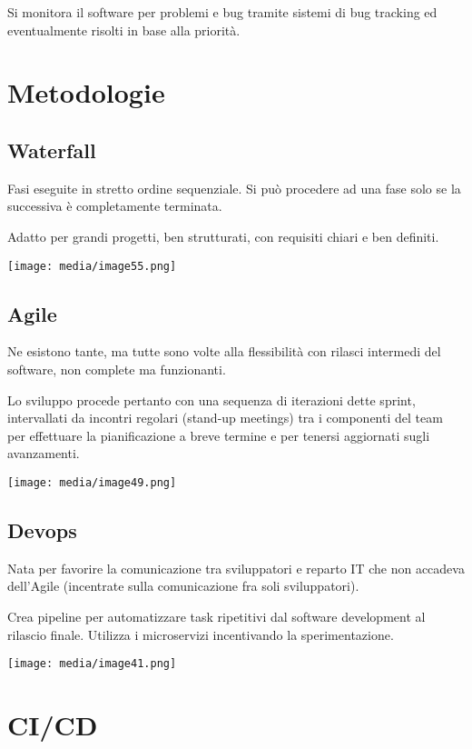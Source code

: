 Si monitora il software per problemi e bug tramite sistemi di bug
tracking ed eventualmente risolti in base alla priorità.

\section{Metodologie}\label{metodologie}

\subsection{Waterfall}\label{waterfall}

Fasi eseguite in stretto ordine sequenziale. Si può procedere ad una
fase solo se la successiva è completamente terminata.

Adatto per grandi progetti, ben strutturati, con requisiti chiari e ben
definiti.

\texttt{[image: media/image55.png]}

\subsection{Agile}\label{agile}

Ne esistono tante, ma tutte sono volte alla flessibilità con rilasci
intermedi del software, non complete ma funzionanti.

Lo sviluppo procede pertanto con una sequenza di iterazioni dette
sprint, intervallati da incontri regolari (stand-up meetings) tra i
componenti del team per effettuare la pianificazione a breve termine e
per tenersi aggiornati sugli avanzamenti.

\texttt{[image: media/image49.png]}

\subsection{Devops}\label{devops}

Nata per favorire la comunicazione tra sviluppatori e reparto IT che non
accadeva dell'Agile (incentrate sulla comunicazione fra soli
sviluppatori).

Crea pipeline per automatizzare task ripetitivi dal software development
al rilascio finale. Utilizza i microservizi incentivando la
sperimentazione.

\texttt{[image: media/image41.png]}

\section{CI/CD}\label{cicd}

